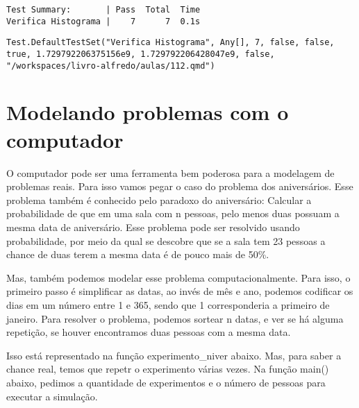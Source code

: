 \documentclass[
  letterpaper,
  DIV=11,
  numbers=noendperiod]{scrreprt}
\begin{document}
\begin{verbatim}
Test Summary:       | Pass  Total  Time
Verifica Histograma |    7      7  0.1s
\end{verbatim}

\begin{verbatim}
Test.DefaultTestSet("Verifica Histograma", Any[], 7, false, false, true, 1.729792206375156e9, 1.729792206428047e9, false, "/workspaces/livro-alfredo/aulas/112.qmd")
\end{verbatim}

\section{Modelando problemas com o
computador}\label{modelando-problemas-com-o-computador}

O computador pode ser uma ferramenta bem poderosa para a modelagem de
problemas reais. Para isso vamos pegar o caso do problema dos
aniversários. Esse problema também é conhecido pelo paradoxo do
aniversário: Calcular a probabilidade de que em uma sala com n pessoas,
pelo menos duas possuam a mesma data de aniversário. Esse problema pode
ser resolvido usando probabilidade, por meio da qual se descobre que se
a sala tem 23 pessoas a chance de duas terem a mesma data é de pouco
mais de 50\%.

Mas, também podemos modelar esse problema computacionalmente. Para isso,
o primeiro passo é simplificar as datas, ao invés de mês e ano, podemos
codificar os dias em um número entre 1 e 365, sendo que 1 corresponderia
a primeiro de janeiro. Para resolver o problema, podemos sortear n
datas, e ver se há alguma repetição, se houver encontramos duas pessoas
com a mesma data.

Isso está representado na função experimento\_niver abaixo. Mas, para
saber a chance real, temos que repetr o experimento várias vezes. Na
função main() abaixo, pedimos a quantidade de experimentos e o número de
pessoas para executar a simulação.
\end{document}
